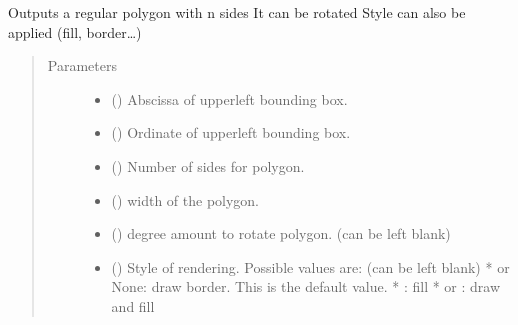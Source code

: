 \documentclass[letterpaper,10pt,english]{sphinxmanual}
\begin{document}
\begin{fulllineitems}
\begin{fulllineitems}
\label{\detokenize{generated/quality_assessment.quality_pdf_report.DefectReportPDF.regular_polygon:quality_assessment.quality_pdf_report.DefectReportPDF.regular_polygon}}
\sphinxAtStartPar
Outputs a regular polygon with n sides
It can be rotated
Style can also be applied (fill, border…)
\begin{quote}\begin{description}
\item[{Parameters}] \leavevmode\begin{itemize}
\item {} 
\sphinxAtStartPar
{} () \textendash{} Abscissa of upper\sphinxhyphen{}left bounding box.

\item {} 
\sphinxAtStartPar
{} () \textendash{} Ordinate of upper\sphinxhyphen{}left bounding box.

\item {} 
\sphinxAtStartPar
{} () \textendash{} Number of sides for polygon.

\item {} 
\sphinxAtStartPar
{} () \textendash{} width of the polygon.

\item {} 
\sphinxAtStartPar
{} () \textendash{} degree amount to rotate polygon. (can be left blank)

\item {} 
\sphinxAtStartPar
{} () \textendash{} Style of rendering. Possible values are: (can be left blank)
*  or None: draw border. This is the default value.
* : fill
*  or : draw and fill


\end{itemize}
\end{description}
\end{quote}
\end{fulllineitems}
\end{fulllineitems}
\end{document}
